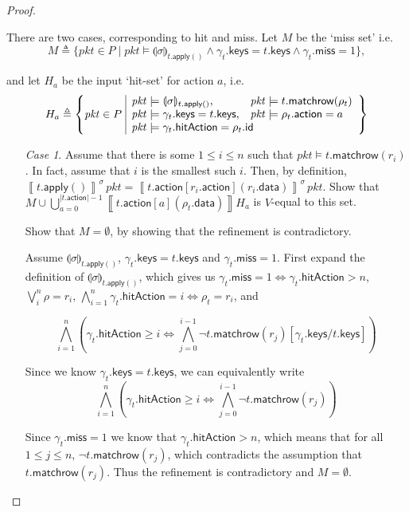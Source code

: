 \documentclass{article}
\newcommand{\pkt}{\mathit{pkt}}
\newcommand{\denote}[1]{\left\llbracket#1\right\rrbracket}
\newcommand{\action}{\mathsf{action}}
\newcommand{\keys}{\mathsf{keys}}
\newcommand{\data}{\mathsf{data}}
\newcommand{\id}{\mathsf{id}}
\newcommand{\hitAction}{\mathsf{hitAction}}
\newcommand{\miss}{\mathsf{miss}}
\newcommand{\apply}{\mathsf{apply}}
\newcommand{\state}[1]{\llparenthesis#1\rrparenthesis}
\newcommand{\matchrow}{\mathsf{matchrow}}
\theoremstyle{plain}
\theoremstyle{definition}
\theoremstyle{remark}
\begin{document}
\begin{proof}
\begin{enumerate}[align=left]
       There are two cases, corresponding to hit and miss. Let $M$ be the `miss
       set' i.e.
       \[M \triangleq \{\pkt \in P \mid \pkt \models \state\sigma_{t.\apply()} \wedge \gamma_t.\keys = t.\keys \wedge \gamma_t.\miss = 1 \},\]

       and let $H_a$ be the input `hit-set' for action $a$, i.e.
      \[ H_a \triangleq \left\{\pkt \in P\,\, \begin{array}{|ll}
        \pkt \models \state\sigma_{t.\apply()}, & \pkt \models t.\matchrow(\rho_t)\\
        \pkt \models \gamma_t.\keys = t.\keys, & \pkt \models \rho_t.\action = a \\
        \multicolumn{2}{|l}{\pkt \models \gamma_t.\hitAction = \rho_t.\id}
      \end{array}\right\}\]

    \begin{enumerate}
    \item[\textit{Case 1}.] Assume that there is some $1 \leq i \leq n$ such
      that $\pkt \models t.\matchrow(r_i)$. In fact, assume that $i$ is the
      smallest such $i$. Then, by definition, $\denote{t.\apply()}^\sigma\,\pkt
      = \denote{t.\action[r_i.\action](r_i.\data)}^\sigma\,\pkt$. Show that
      $M \cup \bigcup_{a=0}^{|t.\action|-1}\denote{t.\action[a](\rho_t.\data)} H_a$ is $V$-equal to this set.

      Show that $M = \emptyset$, by showing that the refinement is contradictory.

      Assume $\state\sigma_{t.\apply()}$, $\gamma_t.\keys = t.\keys$ and
      $\gamma_t.\miss = 1$. First expand the definition of
      $\state\sigma_{t.\apply()}$, which gives us $\gamma_t.\miss = 1
      \Leftrightarrow \gamma_t.\hitAction > n$, $\bigvee_{i}^n \rho = r_i$,
      $\bigwedge_{i=1}^n \gamma_t.\hitAction = i \Leftrightarrow \rho_t = r_i$,
      and

      \[\bigwedge_{i=1}^n \left(\gamma_t.\hitAction \geq i \Leftrightarrow \bigwedge_{j=0}^{i-1}\neg t.\matchrow(r_j)[\gamma_t.\keys/t.\keys]\right)\]

      Since we know $\gamma_t.\keys = t.\keys$, we can equivalently write
      \[\bigwedge_{i=1}^n \left(\gamma_t.\hitAction \geq i \Leftrightarrow \bigwedge_{j=0}^{i-1}\neg t.\matchrow(r_j)\right)\]

      Since $\gamma_t.\miss = 1$ we know that $\gamma_t.\hitAction > n$, which
      means that for all $1 \leq j \leq n$, $\neg t.\matchrow(r_j)$, which
      contradicts the assumption that $t.\matchrow(r_j)$. Thus the refinement is
      contradictory and $M = \emptyset$. \hfill \checkmark


\end{enumerate}
\end{enumerate}
\end{proof}
\end{document}

